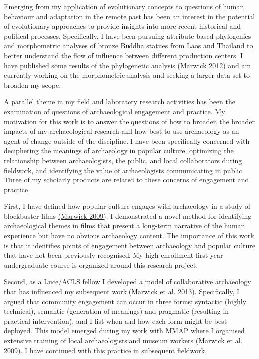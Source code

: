 \documentclass[11pt,article,oneside]{memoir}
\begin{document}
Emerging from my application of evolutionary concepts to questions of human behaviour and adaptation in the remote past has been an interest in the potential of evolutionary approaches to provide insights into more recent historical and political processes.  Specifically, I have been pursuing attribute-based phylogenies and morphometric analyses of bronze Buddha statues from Laos and Thailand to better understand the flow of influence between different production centers. I have published some results of the phylogenetic analysis \href{http://faculty.washington.edu/bmarwick/PDFs/Marwick_2012_Buddha_cladistics.pdf}{(Marwick 2012)} and am currently working on the morphometric analysis and seeking a larger data set to broaden my scope. 

A parallel theme in my field and laboratory research activities has been the examination of questions of archaeological engagement and practice. My motivation for this work is to answer the questions of how to broaden the broader impacts of my archaeological research and how best to use archaeology as an agent of change outside of the discipline. I have been specifically concerned with deciphering the meanings of archaeology in popular culture, optimizing the relationship between archaeologists, the public, and local collaborators during fieldwork, and identifying the value of archaeologists communicating in public. Three of my scholarly products are related to these concerns of engagement and practice. 

First, I have defined how popular culture engages with archaeology in a study of blockbuster films  \href{http://faculty.washington.edu/bmarwick/PDFs/Marwick_2010_WA_Wall-E.pdf}{(Marwick 2009)}. I demonstrated a novel method for identifying archaeological themes in films that present a long-term narrative of the human experience but have no obvious archaeology content. The importance of this work is that it identifies points of engagement between archaeology and popular culture that have not been previously recognised. My high-enrollment first-year undergraduate course is organized around this research project. 

Second, as a Luce/ACLS fellow I developed a model of collaborative archaeology that has influenced my subsequent work {\href{http://faculty.washington.edu/bmarwick/PDFs/Marwick_et_al_2013_community.pdf}{(Marwick et al. 2013)}}. Specifically, I argued that community engagement can occur in three forms: syntactic (highly technical), semantic (generation of meanings) and pragmatic (resulting in practical intervention), and I list when and how each form might be best deployed. This model emerged during my work with MMAP where I organised extensive training of local archaeologists and museum workers {\href{http://faculty.washington.edu/bmarwick/PDFs/Marwick_et_al_2009_MMAP.pdf}{(Marwick et al. 2009)}}. I have continued with this practice in subsequent fieldwork. 
\end{document}

